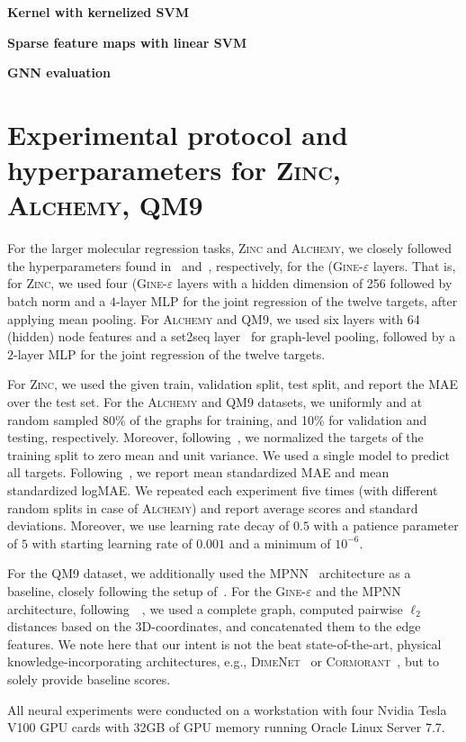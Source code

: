 \documentclass{article}
\newcommand{\xhdr}[1]{{\noindent\bfseries #1}}
\theoremstyle{definition}
\begin{document}
\xhdr{Kernel with kernelized SVM}


\xhdr{Sparse feature maps with linear SVM}


\xhdr{GNN evaluation}


\section{Experimental protocol and hyperparameters for \textsc{Zinc}, \textsc{Alchemy}, \textsc{QM9}}
For the larger molecular regression tasks, \textsc{Zinc} and \textsc{Alchemy}, we closely followed the hyperparameters found in~\cite{Dwi+2020} and~\cite{Che+2020}, respectively, for the (\textsc{Gine-$\varepsilon$} layers. That is, for \textsc{Zinc}, we used four (\textsc{Gine-$\varepsilon$} layers with a hidden dimension of 256 followed by batch norm and a $4$-layer MLP for the joint regression of the twelve targets, after applying mean pooling. For \textsc{Alchemy} and \textsc{QM9}, we used six layers with 64 (hidden) node features and a set2seq layer~\cite{Vin+2016} for graph-level pooling, followed by a $2$-layer MLP for the joint regression of the twelve targets.

For \textsc{Zinc}, we used the given train, validation split, test split, and report the MAE over the test set. For the \textsc{Alchemy} and \textsc{QM9} datasets, we uniformly and at random sampled 80\% of the graphs for training, and 10\% for validation and testing, respectively. Moreover, following~\cite{Che+2020,Gil+2017}, we normalized the targets of the training split to zero mean and unit variance. We used a single model to predict all targets. Following~\cite{Kli+2020}, we report mean standardized MAE and mean standardized logMAE. We repeated each experiment five times (with different random splits in case of \textsc{Alchemy}) and report average scores and standard deviations.  Moreover, we use learning rate decay of $0.5$ with a patience parameter of $5$ with starting learning rate of $0.001$ and a minimum of $10^{-6}$.

For the \textsc{QM9} dataset, we additionally used the \textsc{MPNN}~\cite{Gil+2017} architecture as a baseline, closely following the setup of~\cite{Gil+2017}. For the \textsc{Gine-$\varepsilon$}  and the \textsc{MPNN} architecture, following~\citeauthor{Gil+2017}~\cite{Gil+2017}, we used a complete graph, computed pairwise $\ell_2$ distances based on the 3D-coordinates, and concatenated them to the edge features. We note here that our intent is not the beat state-of-the-art, physical knowledge-incorporating architectures, e.g., \textsc{DimeNet}~\cite{Kli+2020} or \textsc{Cormorant}~\cite{And+2019}, but to solely provide baseline scores. 

All neural experiments were conducted on a workstation with four Nvidia Tesla V100 GPU cards with 32GB of GPU memory running Oracle Linux Server 7.7.
\end{document}
